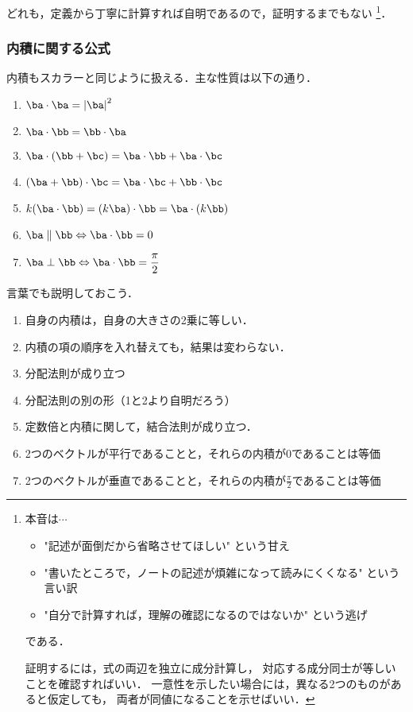             どれも，定義から丁寧に計算すれば自明であるので，証明するまでもない
            \footnote{
                本音は$\cdots$
                \begin{itemize}
                    \item "記述が面倒だから省略させてほしい" という甘え
                    \item "書いたところで，ノートの記述が煩雑になって読みにくくなる" という言い訳
                    \item "自分で計算すれば，理解の確認になるのではないか" という逃げ
                \end{itemize}
                である．

                証明するには，式の両辺を独立に成分計算し，
                対応する成分同士が等しいことを確認すればいい．
                一意性を示したい場合には，異なる2つのものがあると仮定しても，
                両者が同値になることを示せばいい．
            }．

        \subsubsection{内積に関する公式}
            内積もスカラーと同じように扱える．主な性質は以下の通り．
            \begin{enumerate}
                \item $\ba \cdot \ba = {|\ba|}^{2}$
                \item $\ba \cdot \bb = \bb \cdot \ba$
                \item $\ba \cdot (\bb + \bc) = \ba \cdot \bb + \ba \cdot \bc$
                \item $(\ba + \bb) \cdot \bc = \ba \cdot \bc + \bb \cdot \bc$
                \item $k(\ba \cdot \bb) = (k\ba) \cdot \bb = \ba \cdot (k\bb)$
                \item $\ba \parallel \bb \Leftrightarrow \ba \cdot \bb = 0$
                \item $\ba \perp \bb \Leftrightarrow \ba \cdot \bb = \displaystyle\frac{\pi}{2}$
            \end{enumerate}

            言葉でも説明しておこう．
            \begin{enumerate}
                \item 自身の内積は，自身の大きさの2乗に等しい．
                \item 内積の項の順序を入れ替えても，結果は変わらない．
                \item 分配法則が成り立つ
                \item 分配法則の別の形（1と2より自明だろう）
                \item 定数倍と内積に関して，結合法則が成り立つ．
                \item 2つのベクトルが平行であることと，それらの内積が0であることは等価
                \item 2つのベクトルが垂直であることと，それらの内積が$\displaystyle\frac{\pi}{2}$であることは等価
            \end{enumerate}

